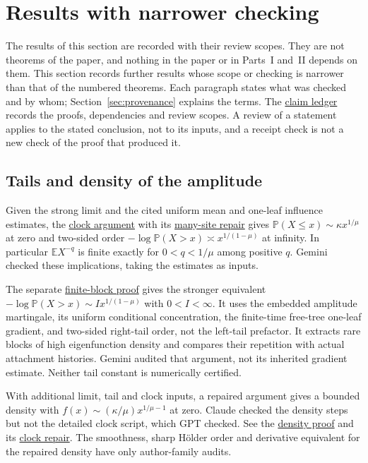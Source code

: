 \documentclass[11pt]{article}
\newcommand{\proofsrc}[2]{\href{https://github.com/uzay-eth/friend-tree-exponent/blob/a0972085ad72ad5685ae7b424988648d1965e73c/#1}{#2}}
\newcommand{\sectag}[1]{\renewcommand{\thesection}{#1}\renewcommand{\theHsection}{#1}}
\theoremstyle{remark}
\numberwithin{equation}{section}
\newcommand{\E}{\mathbb E}
\newcommand{\Prob}{\mathbb P}
\begin{document}
\sectag{NOTES}
\section{Results with narrower checking}\label{sec:further}
The results of this section are recorded with their review scopes. They are not theorems of the paper, and nothing in the paper or in Parts~I and~II depends on them.
This section records further results whose scope or checking is narrower than that of the numbered theorems. Each paragraph states what was checked and by whom; Section~\ref{sec:provenance} explains the terms. The \proofsrc{round2/LEDGER.md}{claim ledger} records the proofs, dependencies and review scopes. A review of a statement applies to the stated conclusion, not to its inputs, and a receipt check is not a new check of the proof that produced it.

\subsection{Tails and density of the amplitude}
Given the strong limit and the cited uniform mean and one-leaf influence estimates, the \proofsrc{round2/proofs/fable/newground/law-of-X/REPORT.md}{clock argument} with its \proofsrc{round2/proofs/fable/newground/law-of-X/referee/many-site-repair.md}{many-site repair} gives $\Prob(X\le x)\sim\kappa x^{1/\mu}$ at zero and two-sided order $-\log\Prob(X>x)\asymp x^{1/(1-\mu)}$ at infinity. In particular $\E X^{-q}$ is finite exactly for $0<q<1/\mu$ among positive $q$. Gemini checked these implications, taking the estimates as inputs.

The separate \proofsrc{round2/proofs/astra-late/source/round2/open/limit-law/right/README.md}{finite-block proof} gives the stronger equivalent $-\log\Prob(X>x)\sim I x^{1/(1-\mu)}$ with $0<I<\infty$. It uses the embedded amplitude martingale, its uniform conditional concentration, the finite-time free-tree one-leaf gradient, and two-sided right-tail order, not the left-tail prefactor. It extracts rare blocks of high eigenfunction density and compares their repetition with actual attachment histories. Gemini audited that argument, not its inherited gradient estimate. Neither tail constant is numerically certified.

With additional limit, tail and clock inputs, a repaired argument gives a bounded density with $f(x)\sim(\kappa/\mu)x^{1/\mu-1}$ at zero. Claude checked the density steps but not the detailed clock script, which GPT checked. See the \proofsrc{round2/proofs/fable/newground/law-of-X/density/REPORT.md}{density proof} and its \proofsrc{round2/proofs/fable/newground/law-of-X/density/bare-triple-repair.md}{clock repair}. The smoothness, sharp H\"older order and derivative equivalent for the repaired density have only author-family audits.
\end{document}

